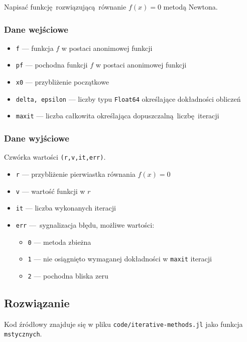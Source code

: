 \documentclass[10pt]{article}
\begin{document}
Napisać funkcję rozwiązującą równanie $f(x) = 0$ metodą Newtona.

\subsubsection{Dane wejściowe}

\begin{itemize}
    \item \texttt{f} — funkcja $f$ w postaci anonimowej funkcji
    \item \texttt{pf} — pochodna funkcji $f$ w postaci anonimowej funkcji
    \item \texttt{x0} — przybliżenie początkowe
    \item \texttt{delta, epsilon} — liczby typu \texttt{Float64} określające dokładności obliczeń
    \item \texttt{maxit} — liczba całkowita określająca dopuszczalną liczbę iteracji
\end{itemize}

\subsubsection{Dane wyjściowe}

Czwórka wartości \texttt{(r,v,it,err)}.

\begin{itemize}
    \item \texttt{r} — przybliżenie pierwiastka równania $f(x) = 0$
    \item \texttt{v} — wartość funkcji w $r$
    \item \texttt{it} — liczba wykonanych iteracji
    \item \texttt{err} — sygnalizacja błędu, możliwe wartości:
    \begin{itemize}
        \item \texttt{0} — metoda zbieżna
        \item \texttt{1} — nie osiągnięto wymaganej dokładności w \texttt{maxit} iteracji
        \item \texttt{2} — pochodna bliska zeru
    \end{itemize}
\end{itemize}

\subsection{Rozwiązanie}

Kod źródłowy znajduje się w pliku \texttt{code/iterative-methods.jl} jako funkcja \texttt{mstycznych}.
\end{document}
